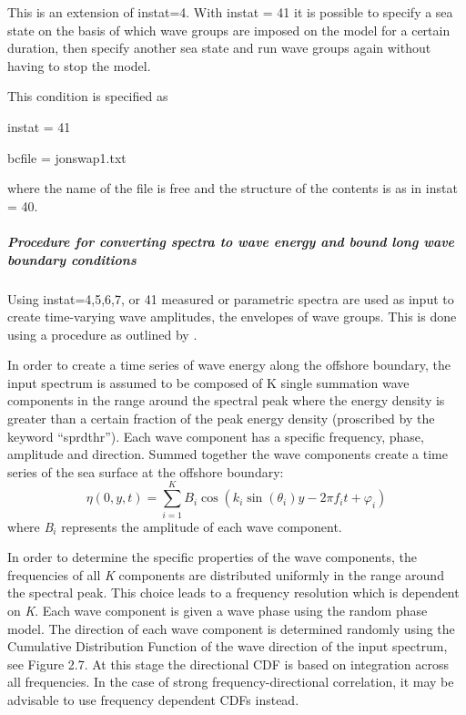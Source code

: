 This is an extension of instat=4. With instat = 41 it is possible to specify a sea state on the basis of which wave groups are imposed on the model for a certain duration, then specify another sea state and run wave groups again without having to stop the model. 

This condition is specified as

instat   = 41

bcfile   = jonswap1.txt

where the name of the file is free and the structure of the contents is as in instat = 40.


\subparagraph{Procedure for converting spectra to wave energy and bound long wave boundary conditions}

Using instat=4,5,6,7, or 41 measured or parametric spectra are used as input to create time-varying wave amplitudes, the envelopes of wave groups. This is done using a procedure as outlined by \citet{VanDongeren2003}.

In order to create a time series of wave energy along the offshore boundary, the input spectrum is assumed to be composed of K single summation wave components \citep{MilesFunke1989, VanDongeren2003} in the range around the spectral peak where the energy density is greater than a certain fraction of the peak energy density (proscribed by the keyword ``sprdthr''). Each wave component has a specific frequency, phase, amplitude and direction. Summed together the wave components create a time series of the sea surface at the offshore boundary:
\begin{equation} \label{ZEqnNum661480} 
\eta \left(0,y,t\right)=\sum _{i=1}^{K}B_{i} \cos \left(k_{i} \sin \left(\theta _{i} \right)y-2\pi f_{i} t+\varphi _{i} \right)  
\end{equation} 
where \textit{B${}_{i}$} represents the amplitude of each wave component. 

In order to determine the specific properties of the wave components, the frequencies of all \textit{K} components are distributed uniformly in the range around the spectral peak. This choice leads to a frequency resolution which is dependent on \textit{K}. Each wave component is given a wave phase using the random phase model. The direction of each wave component is determined randomly using the Cumulative Distribution Function of the wave direction of the input spectrum, see Figure 2.7. At this stage the directional CDF is based on integration across all frequencies. In the case of strong frequency-directional correlation, it may be advisable to use frequency dependent CDFs instead.

